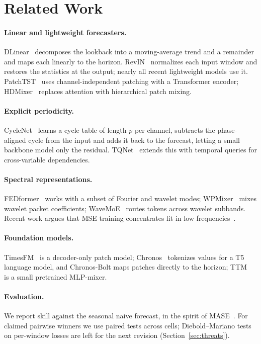 \documentclass[11pt,a4paper]{article}
\begin{document}
\section{Related Work}
\label{sec:related}
\paragraph{Linear and lightweight forecasters.} DLinear~\cite{zeng2023dlinear} decomposes the lookback into a moving-average trend and a remainder and maps each linearly to the horizon. RevIN~\cite{kim2021revin} normalizes each input window and restores the statistics at the output; nearly all recent lightweight models use it. PatchTST~\cite{nie2023patchtst} uses channel-independent patching with a Transformer encoder; HDMixer~\cite{hdmixer2024} replaces attention with hierarchical patch mixing.

\paragraph{Explicit periodicity.} CycleNet~\cite{liu2024cyclenet} learns a cycle table of length $p$ per channel, subtracts the phase-aligned cycle from the input and adds it back to the forecast, letting a small backbone model only the residual. TQNet~\cite{lin2025tqnet} extends this with temporal queries for cross-variable dependencies.

\paragraph{Spectral representations.} FEDformer~\cite{zhou2022fedformer} works with a subset of Fourier and wavelet modes; WPMixer~\cite{wpmixer2024} mixes wavelet packet coefficients; WaveMoE~\cite{WaveMoE2026} routes tokens across wavelet subbands. Recent work argues that MSE training concentrates fit in low frequencies~\cite{FreqCycle2026,FreqLens2026}.

\paragraph{Foundation models.} TimesFM~\cite{das2024timesfm} is a decoder-only patch model; Chronos~\cite{ansari2024chronos} tokenizes values for a T5 language model, and Chronos-Bolt maps patches directly to the horizon; TTM~\cite{ekambaram2024ttm} is a small pretrained MLP-mixer.

\paragraph{Evaluation.} We report skill against the seasonal naive forecast, in the spirit of MASE~\cite{hyndman2006another}. For claimed pairwise winners we use paired tests across cells; Diebold--Mariano tests~\cite{diebold1995comparing} on per-window losses are left for the next revision (Section~\ref{sec:threats}).
\end{document}
